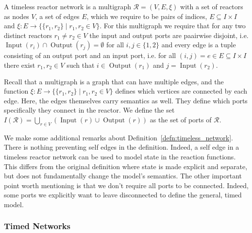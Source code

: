 \begin{defn}
    \label{defn:timeless_network}
A timeless reactor network is a multigraph $\mathcal{R} = (V,E,\xi)$ with a set of reactors as nodes $V$,
a set of edges $E$, which we require to be pairs of indices, $E \subseteq I \times I$ and $\xi : E \rightarrow \{ \{r_1, r_2\} \mid r_1, r_2 \in V \}$.
For this multigraph we require that for any two distinct reactors $r_1 \neq r_2 \in V$ the input and output ports are paairwise disjoint,
i.e. $\operatorname{Input}(r_i) \cap \operatorname{Output}(r_j) = \emptyset$ for all $i,j \in \{ 1, 2 \}$ and every edge is a tuple consisting of an output port and an input port,
i.e. for all $(i,j) = e \in E \subseteq I \times I$ there exist $r_1,r_2 \in V$ such that $i \in \operatorname{Output}(r_1)$ and $j = \operatorname{Input}(r_2)$.
\end{defn}

Recall that a multigraph is a graph that can have multiple edges, and the function $\xi : E \rightarrow \{ \{r_1, r_2\} \mid r_1, r_2 \in V \}$ defines which vertices are connected by each edge.
Here, the edges themselves carry semantics as well. They define which ports specifically they connect in the reactor.
We define the set $I(\mathcal{R}) = \bigcup_{r \in V}(\operatorname{Input}(r) \cup \operatorname{Output}(r))$ as the set of ports of $\mathcal{R}$.

We make some additional remarks about Definition~\ref{defn:timeless_network}. 
There is nothing preventing self edges in the definition.
Indeed, a self edge in a timeless reactor network can be used to model state in the reaction functions.
This differs from the original definition where state is made explicit and separate, but does not fundamentally change the model's semantics.
The other important point worth mentioning is that we don't require all ports to be connected.
Indeed, some ports we explicitly want to leave disconnected to define the general, timed model. 

\subsubsection{Timed Networks}

